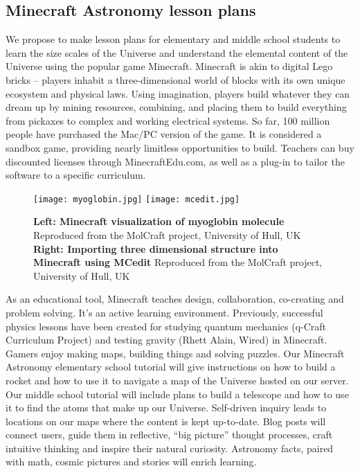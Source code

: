 \documentclass[12pt]{article}
\begin{document}
\begin{small}
\subsection{Minecraft Astronomy lesson plans}




We propose to make lesson plans for elementary and middle school students to 
learn the size scales of the Universe and understand the elemental content 
of the Universe using the popular game Minecraft. 
Minecraft is akin to digital Lego bricks – players inhabit a 
three-dimensional 
world of blocks with its own unique ecosystem and physical laws. Using 
imagination, 
players build whatever they can dream up by mining resources, combining, 
and placing them to build everything from pickaxes 
to complex and working electrical systems. So far, 100 million people have 
purchased 
the Mac/PC version of the game. 
It is considered a sandbox game, providing nearly limitless opportunities 
to  build. Teachers can buy discounted licenses through MinecraftEdu.com, as 
well as a plug-in to tailor the software to a specific curriculum. 



\begin{figure}%
\centering
\texttt{[image: myoglobin.jpg]}
\texttt{[image: mcedit.jpg]}
\caption{\footnotesize{{\bf Left:
Minecraft visualization of myoglobin molecule} 
Reproduced from the MolCraft project, University of Hull, UK
{\bf Right: Importing three dimensional structure into Minecraft
using MCedit} Reproduced from the MolCraft project, University of Hull, UK
}}
\label{molcraft}
\end{figure}


As an educational tool, Minecraft teaches design, collaboration, co-creating 
and problem solving. It’s an active learning environment. Previously, 
successful
 physics lessons have been created for studying quantum mechanics 
(q-Craft Curriculum Project) and testing gravity (Rhett Alain, Wired) in 
Minecraft. Gamers enjoy making maps, building things and solving puzzles. 
Our 
Minecraft Astronomy elementary school tutorial will give instructions on 
how to 
build a rocket and how to use it to navigate a map of the Universe hosted 
on our server. Our middle school tutorial will include plans to build a 
telescope and 
how to use it to find the atoms that make up our Universe. Self-driven 
inquiry 
leads to locations on our maps where the content is kept up-to-date.
 Blog 
posts will connect users, guide them in reflective, 
“big picture” 
thought processes, craft intuitive thinking and inspire their natural 
curiosity. 
Astronomy facts, paired with math, cosmic pictures and stories will 
enrich learning.
 

\end{small}
\end{document}
